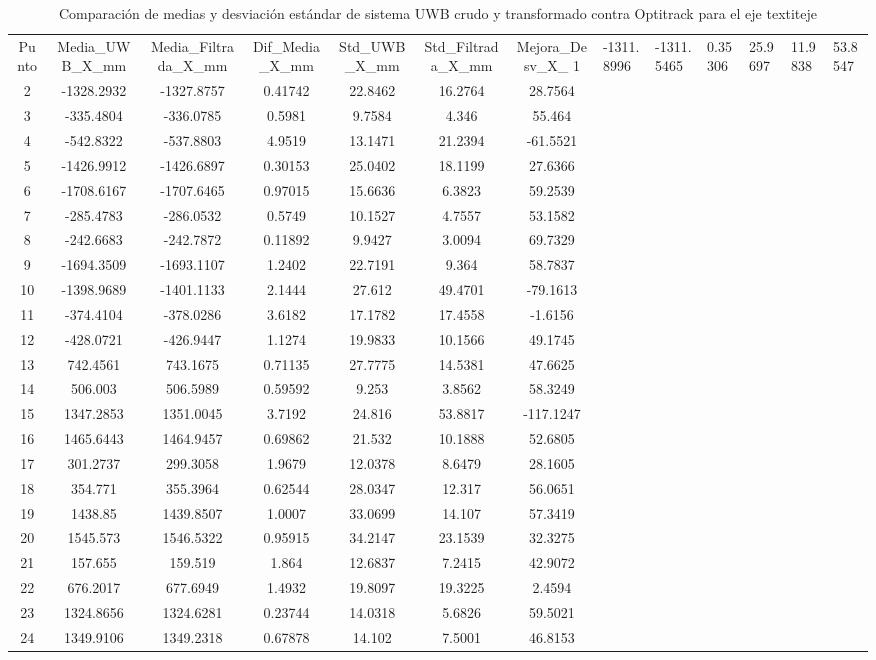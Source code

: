\begin{table}[H]
\centering
\begin{tabular}{c c c c c c c }
\hline
Punto & Media\_UWB\_X\_mm & Media\_Filtrada\_X\_mm & Dif\_Media\_X\_mm & Std\_UWB\_X\_mm & Std\_Filtrada\_X\_mm & Mejora\_Desv\_X\_%
1 & -1311.8996 & -1311.5465 & 0.35306 & 25.9697 & 11.9838 & 53.8547\\ 
2 & -1328.2932 & -1327.8757 & 0.41742 & 22.8462 & 16.2764 & 28.7564\\ 
3 & -335.4804 & -336.0785 & 0.5981 & 9.7584 & 4.346 & 55.464\\ 
4 & -542.8322 & -537.8803 & 4.9519 & 13.1471 & 21.2394 & -61.5521\\ 
5 & -1426.9912 & -1426.6897 & 0.30153 & 25.0402 & 18.1199 & 27.6366\\ 
6 & -1708.6167 & -1707.6465 & 0.97015 & 15.6636 & 6.3823 & 59.2539\\ 
7 & -285.4783 & -286.0532 & 0.5749 & 10.1527 & 4.7557 & 53.1582\\ 
8 & -242.6683 & -242.7872 & 0.11892 & 9.9427 & 3.0094 & 69.7329\\ 
9 & -1694.3509 & -1693.1107 & 1.2402 & 22.7191 & 9.364 & 58.7837\\ 
10 & -1398.9689 & -1401.1133 & 2.1444 & 27.612 & 49.4701 & -79.1613\\ 
11 & -374.4104 & -378.0286 & 3.6182 & 17.1782 & 17.4558 & -1.6156\\ 
12 & -428.0721 & -426.9447 & 1.1274 & 19.9833 & 10.1566 & 49.1745\\ 
13 & 742.4561 & 743.1675 & 0.71135 & 27.7775 & 14.5381 & 47.6625\\ 
14 & 506.003 & 506.5989 & 0.59592 & 9.253 & 3.8562 & 58.3249\\ 
15 & 1347.2853 & 1351.0045 & 3.7192 & 24.816 & 53.8817 & -117.1247\\ 
16 & 1465.6443 & 1464.9457 & 0.69862 & 21.532 & 10.1888 & 52.6805\\ 
17 & 301.2737 & 299.3058 & 1.9679 & 12.0378 & 8.6479 & 28.1605\\ 
18 & 354.771 & 355.3964 & 0.62544 & 28.0347 & 12.317 & 56.0651\\ 
19 & 1438.85 & 1439.8507 & 1.0007 & 33.0699 & 14.107 & 57.3419\\ 
20 & 1545.573 & 1546.5322 & 0.95915 & 34.2147 & 23.1539 & 32.3275\\ 
21 & 157.655 & 159.519 & 1.864 & 12.6837 & 7.2415 & 42.9072\\ 
22 & 676.2017 & 677.6949 & 1.4932 & 19.8097 & 19.3225 & 2.4594\\ 
23 & 1324.8656 & 1324.6281 & 0.23744 & 14.0318 & 5.6826 & 59.5021\\ 
24 & 1349.9106 & 1349.2318 & 0.67878 & 14.102 & 7.5001 & 46.8153\\ 
\hline
\end{tabular}
\caption{Comparación de medias y desviación estándar de sistema UWB crudo y transformado contra Optitrack para el eje textit{eje}}
\end{table}
